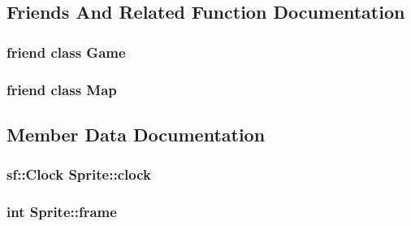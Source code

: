 \subsection{Friends And Related Function Documentation}
\subsubsection[{\texorpdfstring{Game}{Game}}]{\setlength{\rightskip}{0pt plus 5cm}friend class Game\hspace{0.3cm}{\ttfamily [friend]}}\hypertarget{classSprite_aa2fab026580d6f14280c2ffb8063a314}{}\label{classSprite_aa2fab026580d6f14280c2ffb8063a314}
\subsubsection[{\texorpdfstring{Map}{Map}}]{\setlength{\rightskip}{0pt plus 5cm}friend class {\bf Map}\hspace{0.3cm}{\ttfamily [friend]}}\hypertarget{classSprite_ad2f32e921244459f7cc6d50355429cc6}{}\label{classSprite_ad2f32e921244459f7cc6d50355429cc6}


\subsection{Member Data Documentation}
\subsubsection[{\texorpdfstring{clock}{clock}}]{\setlength{\rightskip}{0pt plus 5cm}sf\+::\+Clock Sprite\+::clock\hspace{0.3cm}{\ttfamily [protected]}}\hypertarget{classSprite_aef3f5fc132fdf803f6796d204bba9007}{}\label{classSprite_aef3f5fc132fdf803f6796d204bba9007}
\subsubsection[{\texorpdfstring{frame}{frame}}]{\setlength{\rightskip}{0pt plus 5cm}int Sprite\+::frame\hspace{0.3cm}{\ttfamily [protected]}}\hypertarget{classSprite_abdcdaf5dc3b8842622536f318d6daac3}{}\label{classSprite_abdcdaf5dc3b8842622536f318d6daac3}
